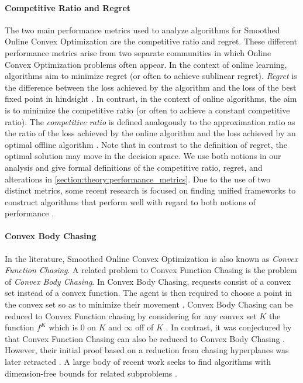 \paragraph{Competitive Ratio and Regret} The two main performance metrics used to analyze algorithms for Smoothed Online Convex Optimization are the competitive ratio and regret. These different performance metrics arise from two separate communities in which Online Convex Optimization problems often appear. In the context of online learning, algorithms aim to minimize regret (or often to achieve sublinear regret). \textit{Regret} is the difference between the loss achieved by the algorithm and the loss of the best fixed point in hindsight \cite{Chen2018}. In contrast, in the context of online algorithms, the aim is to minimize the competitive ratio (or often to achieve a constant competitive ratio). The \textit{competitive ratio} is defined analogously to the approximation ratio as the ratio of the loss achieved by the online algorithm and the loss achieved by an optimal offline algorithm \cite{Chen2018}. Note that in contrast to the definition of regret, the optimal solution may move in the decision space. We use both notions in our analysis and give formal definitions of the competitive ratio, regret, and alterations in \autoref{section:theory:performance_metrics}. Due to the use of two distinct metrics, some recent research is focused on finding unified frameworks to construct algorithms that perform well with regard to both notions of performance \cite{Chen2018, Goel2019}.

\paragraph{Convex Body Chasing} In the literature, Smoothed Online Convex Optimization is also known as \textit{Convex Function Chasing}. A related problem to Convex Function Chasing is the problem of \textit{Convex Body Chasing}. In Convex Body Chasing, requests consist of a convex set instead of a convex function. The agent is then required to choose a point in the convex set so as to minimize their movement \cite{Antoniadis2016}. Convex Body Chasing can be reduced to Convex Function chasing by considering for any convex set $K$ the function $f^K$ which is 0 on $K$ and $\infty$ off of $K$ \cite{Sellke2019}. In contrast, it was conjectured by \citeauthor*{Antoniadis2016} that Convex Function Chasing can also be reduced to Convex Body Chasing \cite{Antoniadis2016}. However, their initial proof based on a reduction from chasing hyperplanes was later retracted \cite{Pruhs2021}. A large body of recent work seeks to find algorithms with dimension-free bounds for related subproblems \cite{Bubeck2018, Bubeck2018_2, Argue2019, Argue2020}.

